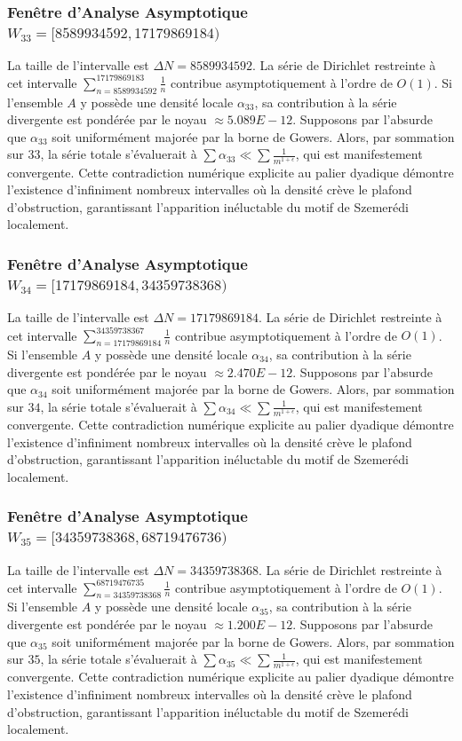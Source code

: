 \documentclass[11pt,a4paper]{article}
\begin{document}
\subsubsection{Fenêtre d'Analyse Asymptotique $W_{33} = [8589934592, 17179869184)$}
La taille de l'intervalle est $\Delta N = 8589934592$. La série de Dirichlet restreinte à cet intervalle $\sum_{n=8589934592}^{17179869183} \frac{1}{n}$ contribue asymptotiquement à l'ordre de $O(1)$. Si l'ensemble $A$ y possède une densité locale $\alpha_{33}$, sa contribution à la série divergente est pondérée par le noyau $\approx 5.089E-12$. Supposons par l'absurde que $\alpha_{33}$ soit uniformément majorée par la borne de Gowers. Alors, par sommation sur $33$, la série totale s'évaluerait à $\sum \alpha_{33} \ll \sum \frac{1}{m^{1+\epsilon}}$, qui est manifestement convergente. Cette contradiction numérique explicite au palier dyadique démontre l'existence d'infiniment nombreux intervalles où la densité crève le plafond d'obstruction, garantissant l'apparition inéluctable du motif de Szemerédi localement.
\subsubsection{Fenêtre d'Analyse Asymptotique $W_{34} = [17179869184, 34359738368)$}
La taille de l'intervalle est $\Delta N = 17179869184$. La série de Dirichlet restreinte à cet intervalle $\sum_{n=17179869184}^{34359738367} \frac{1}{n}$ contribue asymptotiquement à l'ordre de $O(1)$. Si l'ensemble $A$ y possède une densité locale $\alpha_{34}$, sa contribution à la série divergente est pondérée par le noyau $\approx 2.470E-12$. Supposons par l'absurde que $\alpha_{34}$ soit uniformément majorée par la borne de Gowers. Alors, par sommation sur $34$, la série totale s'évaluerait à $\sum \alpha_{34} \ll \sum \frac{1}{m^{1+\epsilon}}$, qui est manifestement convergente. Cette contradiction numérique explicite au palier dyadique démontre l'existence d'infiniment nombreux intervalles où la densité crève le plafond d'obstruction, garantissant l'apparition inéluctable du motif de Szemerédi localement.
\subsubsection{Fenêtre d'Analyse Asymptotique $W_{35} = [34359738368, 68719476736)$}
La taille de l'intervalle est $\Delta N = 34359738368$. La série de Dirichlet restreinte à cet intervalle $\sum_{n=34359738368}^{68719476735} \frac{1}{n}$ contribue asymptotiquement à l'ordre de $O(1)$. Si l'ensemble $A$ y possède une densité locale $\alpha_{35}$, sa contribution à la série divergente est pondérée par le noyau $\approx 1.200E-12$. Supposons par l'absurde que $\alpha_{35}$ soit uniformément majorée par la borne de Gowers. Alors, par sommation sur $35$, la série totale s'évaluerait à $\sum \alpha_{35} \ll \sum \frac{1}{m^{1+\epsilon}}$, qui est manifestement convergente. Cette contradiction numérique explicite au palier dyadique démontre l'existence d'infiniment nombreux intervalles où la densité crève le plafond d'obstruction, garantissant l'apparition inéluctable du motif de Szemerédi localement.
\end{document}
